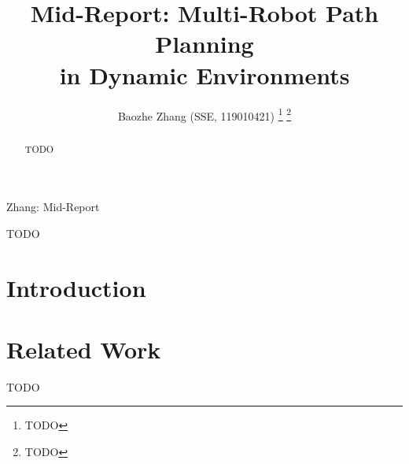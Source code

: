 \documentclass[letterpaper,journal]{IEEEtran}
\begin{document}
\title{Mid-Report: Multi-Robot Path Planning \\in Dynamic Environments}

\author{Baozhe Zhang (SSE, 119010421)
\thanks{TODO}%
\thanks{TODO}}

%
{Zhang: Mid-Report}


\maketitle

\begin{abstract}
TODO
\end{abstract}

\begin{IEEEkeywords}
  TODO
\end{IEEEkeywords}

\section{Introduction}

\section{Related Work}
TODO \cite{Falanga_pampc}



\end{document}
